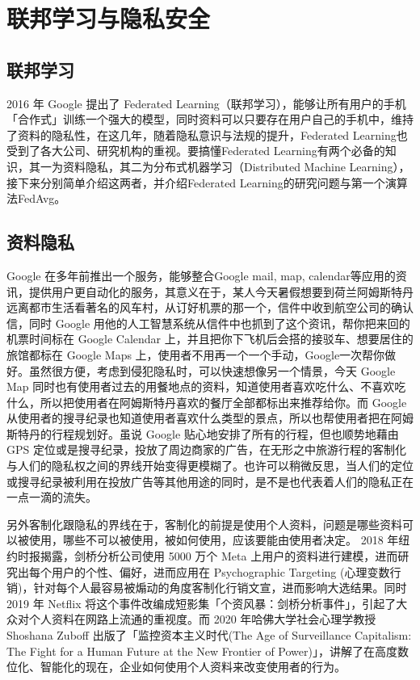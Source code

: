 \chapter{联邦学习与隐私安全}
\label{chap:2}

\section{联邦学习}

2016 年 Google 提出了 Federated Learning（联邦学习），能够让所有用户的手机「合作式」训练一个强大的模型，同时资料可以只要存在用户自己的手机中，维持了资料的隐私性，在这几年，随着隐私意识与法规的提升，Federated Learning也受到了各大公司、研究机构的重视。要搞懂Federated Learning有两个必备的知识，其一为资料隐私，其二为分布式机器学习（Distributed Machine Learning），接下来分别简单介绍这两者，并介绍Federated Learning的研究问题与第一个演算法FedAvg。


\section{资料隐私}

Google 在多年前推出一个服务，能够整合Google mail, map, calendar等应用的资讯，提供用户更自动化的服务，其意义在于，某人今天暑假想要到荷兰阿姆斯特丹远离都市生活看著名的风车村，从订好机票的那一个，信件中收到航空公司的确认信，同时 Google 用他的人工智慧系统从信件中也抓到了这个资讯，帮你把来回的机票时间标在 Google Calendar 上，并且把你下飞机后会搭的接驳车、想要居住的旅馆都标在 Google Maps 上，使用者不用再一个一个手动，Google一次帮你做好。虽然很方便，考虑到侵犯隐私时，可以快速想像另一个情景，今天 Google Map 同时也有使用者过去的用餐地点的资料，知道使用者喜欢吃什么、不喜欢吃什么，所以把使用者在阿姆斯特丹喜欢的餐厅全部都标出来推荐给你。而 Google 从使用者的搜寻纪录也知道使用者喜欢什么类型的景点，所以也帮使用者把在阿姆斯特丹的行程规划好。虽说 Google 贴心地安排了所有的行程，但也顺势地藉由 GPS 定位或是搜寻纪录，投放了周边商家的广告，在无形之中旅游行程的客制化与人们的隐私权之间的界线开始变得更模糊了。也许可以稍微反思，当人们的定位或搜寻纪录被利用在投放广告等其他用途的同时，是不是也代表着人们的隐私正在一点一滴的流失。

 另外客制化跟隐私的界线在于，客制化的前提是使用个人资料，问题是哪些资料可以被使用，哪些不可以被使用，被如何使用，应该要能由使用者决定。 2018 年纽约时报揭露，剑桥分析公司使用 5000 万个 Meta 上用户的资料进行建模，进而研究出每个用户的个性、偏好，进而应用在 Psychographic Targeting (心理变数行销)，针对每个人最容易被煽动的角度客制化行销文宣，进而影响大选结果。同时 2019 年 Netflix 将这个事件改编成短影集「个资风暴：剑桥分析事件」，引起了大众对个人资料在网路上流通的重视度。而 2020 年哈佛大学社会心理学教授 Shoshana Zuboff 出版了「监控资本主义时代(The Age of Surveillance Capitalism: The Fight for a Human Future at the New Frontier of Power)」，讲解了在高度数位化、智能化的现在，企业如何使用个人资料来改变使用者的行为。

